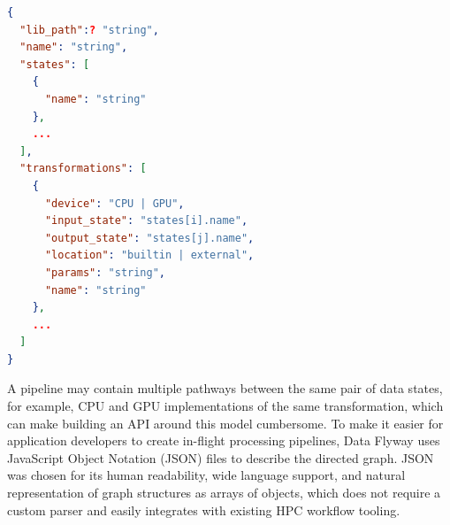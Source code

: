 \begin{lstlisting}[language=json, firstnumber=1,
  caption={JSON schema for the transformation graph. The ellipsis \texttt{...} indicates that one or more entries may be present. Fields marked ? are optional.},
  label={fig:transformation-schema},
  float=htbp
]
{
  "lib_path":? "string",
  "name": "string",
  "states": [
    {
      "name": "string"
    },
    ...
  ],
  "transformations": [
    {
      "device": "CPU | GPU",
      "input_state": "states[i].name",
      "output_state": "states[j].name",
      "location": "builtin | external",
      "params": "string",
      "name": "string"
    },
    ...
  ]
}
\end{lstlisting}

A pipeline may contain multiple pathways between the same pair of data states, for example, CPU and GPU implementations of the same transformation, which can make building an API around this model cumbersome. To make it easier for application developers to create in-flight processing pipelines, Data Flyway uses JavaScript Object Notation (JSON) files to describe the directed graph. JSON was chosen for its human readability, wide language support, and natural representation of graph structures as arrays of objects, which does not require a custom parser and easily integrates with existing HPC workflow tooling.

